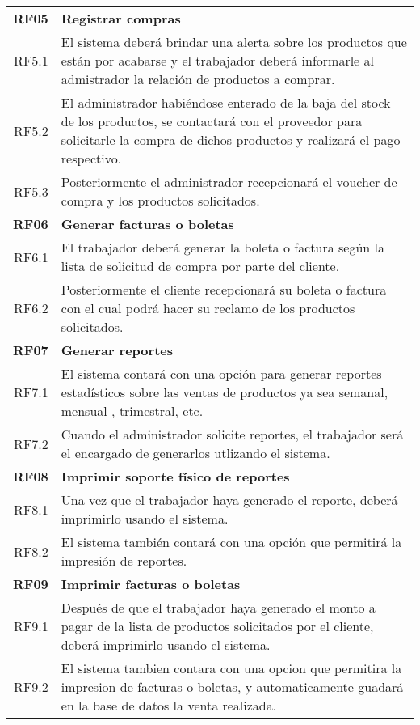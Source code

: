 \documentclass[a4paper,11pt, spanish]{report}
\begin{document}
{{{{{{{{{{{{{\begin{longtable}{r|p{4.1in}}
      \textbf{\large RF05} & \textbf{\large Registrar compras} \\
      RF5.1 & El sistema deberá brindar una alerta sobre los productos que están por acabarse y el trabajador deberá informarle al admistrador la relación de productos a comprar. \\
      RF5.2 & El administrador habiéndose enterado de la baja del stock de los productos, se contactará con el proveedor para solicitarle la compra de dichos productos y realizará el pago respectivo. \\
      RF5.3 & Posteriormente el administrador recepcionará el voucher de compra y los productos solicitados.\\ \hline
      \textbf{\large RF06} & \textbf{\large Generar facturas o boletas}\\
      RF6.1 & El trabajador deberá generar la boleta o factura según la lista de solicitud de compra por parte del cliente.\\
      RF6.2 & Posteriormente el cliente recepcionará su boleta o factura con el cual podrá hacer su reclamo de los productos solicitados.\\ \hline 
      \textbf{\large RF07} & \textbf{\large Generar reportes }\\
      RF7.1 & El sistema contará con una opción para generar reportes estadísticos sobre las ventas de productos ya sea semanal, mensual , trimestral, etc.\\
      RF7.2 & Cuando el administrador solicite reportes, el trabajador será el encargado de generarlos utlizando el sistema.\\ \hline
      \textbf{\large RF08} & \textbf{\large Imprimir soporte físico de reportes} \\
      RF8.1 & Una vez que el trabajador haya generado el reporte, deberá imprimirlo usando el sistema.\\
      RF8.2 & El sistema también contará con una opción que permitirá la impresión de reportes.\\ \hline
      \textbf{\large RF09} & \textbf{\large Imprimir facturas o boletas} \\
      RF9.1 & Después de que el trabajador haya generado el monto a pagar de la lista de productos solicitados por el cliente, deberá imprimirlo usando el sistema.\\
      RF9.2 & El sistema tambien contara con una opcion que permitira la impresion de facturas o boletas, y automaticamente guadará en la base de datos la venta realizada.\\


\end{longtable}}}}}}}}}}}}}}
\end{document}
